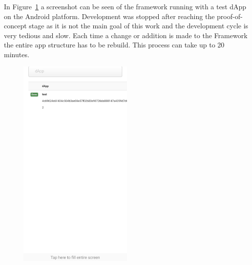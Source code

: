 In Figure~\ref{fig:android-app} a screenshot can be seen of the framework running with a test dApp on the Android platform. Development was stopped after reaching the proof-of-concept stage as it is not the main goal of this work and the development cycle is very tedious and slow. Each time a change or addition is made to the Framework the entire app structure has to be rebuild. This process can take up to 20 minutes. 

\begin{figure}[h!]
	\centering
	\includegraphics[width=0.5\textwidth]{images/android-app-screenshot.jpg}
	\caption{\label{fig:android-app}}
\end{figure}



